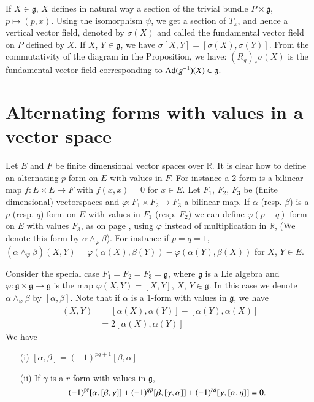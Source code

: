\begin{remark}\label{chap11-rem11.2}
If $X\in \mathfrak{g}$, $X$ defines in natural way a section of the trivial bundle $P\times \mathfrak{g}$, $p\mapsto (p,x)$. Using the isomorphism $\psi$, we get a section of $T_{\pi}$, and hence a vertical vector field, denoted by $\sigma(X)$ and called the fundamental vector field on $P$ defined by $X$. If $X$, $Y\in \mathfrak{g}$, we have $\sigma[X,Y]=[\sigma(X),\sigma(Y)]$. From the commutativity of the diagram in the Proposition, we have: $(R_{g})_{*}\sigma(X)$ is the fundamental vector field corresponding to $\operatorname{Ad}(g^{-1})(X)\in \mathfrak{g}$.
\end{remark}

\section*{Alternating forms with values in a vector space}

Let $E$ and $F$ be finite dimensional vector spaces over $\mathbb{R}$. It is clear how to define an alternating $p$-form on $E$ with values in $F$. For instance a $2$-form is a bilinear map $f:E\times E\to F$ with $f(x,x)=0$ for $x\in E$. Let $F_{1}$, $F_{2}$, $F_{3}$ be (finite dimensional) vector\pageoriginale spaces and $\varphi:F_{1}\times F_{2}\to F_{3}$ a bilinear map. If $\alpha$ (resp. $\beta$) is a $p$ (resp. $q$) form on $E$ with values in $F_{1}$ (resp. $F_{2}$) we can define $\varphi(p+q)$ form on $E$ with values $F_{3}$, as on page \pageref{page13}, using $\varphi$ instead of multiplication in $\mathbb{R}$, (We denote this form by $\alpha\wedge_{\varphi}\beta$). For instance if $p=q=1$, $(\alpha\wedge_{\varphi}\beta)(X,Y)=\varphi(\alpha(X),\beta(Y))-\varphi(\alpha(Y),\beta(X))$ for $X$, $Y\in E$.

Consider the special case $F_{1}=F_{2}=F_{3}=\mathfrak{g}$, where $\mathfrak{g}$ is a Lie algebra and $\varphi:\mathfrak{g}\times \mathfrak{g}\to \mathfrak{g}$ is the map $\varphi(X,Y)=[X,Y]$, $X$, $Y\in \mathfrak{g}$. In this case we denote $\alpha\wedge_{\varphi}\beta$ by $[\alpha,\beta]$. Note that if $\alpha$ is a $1$-form with values in $\mathfrak{g}$, we have
\begin{align*}
[\alpha,\alpha](X,Y) &= [\alpha(X),\alpha(Y)]-[\alpha(Y),\alpha(X)]\\[3pt]
                     &= 2[\alpha(X),\alpha(Y)]
\end{align*}
We have 
\begin{itemize}
\item[(i)] $[\alpha,\beta]=(-1)^{pq+1}[\beta,\alpha]$

\item[(ii)] If $\gamma$ is a $r$-form with values in $\mathfrak{g}$,
$$
(-1)^{\operatorname{pr}}[\alpha,[\beta,\gamma]]+(-1)^{qp}[\beta,[\gamma,\alpha]]+(-1)^{rq}[\gamma,[\alpha,\eta]]=0.
$$
\end{itemize}

